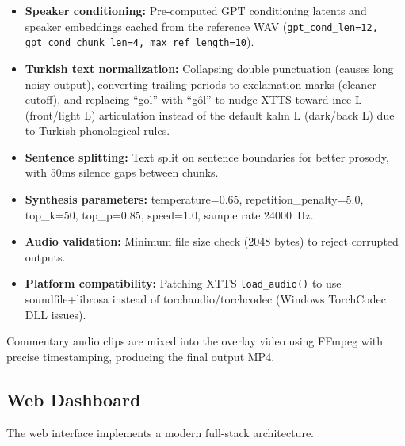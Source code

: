 \documentclass[10pt,twocolumn,a4paper]{article}
\begin{document}
\begin{itemize}[noitemsep,topsep=0pt]
  \item \textbf{Speaker conditioning:} Pre-computed GPT conditioning latents and speaker embeddings cached from the reference WAV (\texttt{gpt\_cond\_len=12, gpt\_cond\_chunk\_len=4, max\_ref\_length=10}).
  \item \textbf{Turkish text normalization:} Collapsing double punctuation (causes long noisy output), converting trailing periods to exclamation marks (cleaner cutoff), and replacing ``gol'' with ``g\^{o}l'' to nudge XTTS toward ince L (front/light L) articulation instead of the default kal{\i}n L (dark/back L) due to Turkish phonological rules.
  \item \textbf{Sentence splitting:} Text split on sentence boundaries for better prosody, with 50ms silence gaps between chunks.
  \item \textbf{Synthesis parameters:} temperature=0.65, repetition\_penalty=5.0, top\_k=50, top\_p=0.85, speed=1.0, sample rate 24000~Hz.
  \item \textbf{Audio validation:} Minimum file size check (2048 bytes) to reject corrupted outputs.
  \item \textbf{Platform compatibility:} Patching XTTS \texttt{load\_audio()} to use soundfile+librosa instead of torchaudio/torchcodec (Windows TorchCodec DLL issues).
\end{itemize}

Commentary audio clips are mixed into the overlay video using FFmpeg with precise timestamping, producing the final output MP4.

\subsection{Web Dashboard}

The web interface implements a modern full-stack architecture.
\end{document}

